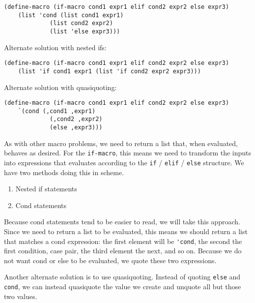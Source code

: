 \begin{blocksection}
\begin{solution}[0.5in]
\begin{lstlisting}
(define-macro (if-macro cond1 expr1 elif cond2 expr2 else expr3)
    (list 'cond (list cond1 expr1)
             (list cond2 expr2)
             (list 'else expr3)))
\end{lstlisting}
Alternate solution with nested ifs:
\begin{lstlisting}
(define-macro (if-macro cond1 expr1 elif cond2 expr2 else expr3)
    (list 'if cond1 expr1 (list 'if cond2 expr2 expr3)))
\end{lstlisting}
Alternate solution with quasiquoting:
\begin{lstlisting}
(define-macro (if-macro cond1 expr1 elif cond2 expr2 else expr3)
    `(cond (,cond1 ,expr1)
             (,cond2 ,expr2)
             (else ,expr3)))
\end{lstlisting}

As with other macro problems, we need to return a list that, 
when evaluated, behaves as desired. For the \lstinline{if-macro}, this
means we need to transform the inputs into expressions that 
evaluates according to the \lstinline{if} / \lstinline{elif} / \lstinline{else} structure. 
We have two methods doing this in scheme. 
\begin{enumerate}
    \item Nested if statements
    \item Cond statements
\end{enumerate}
Because cond statements tend to be easier to read, we will take this 
approach. Since we need to return a list to be evaluated, this means 
we should return a list that matches a cond expression: the first 
element will be \lstinline{'cond}, the second the first condition, case pair, 
the third element the next, and so on. Because we do not want cond 
or else to be evaluated, we quote these two expressions. 

Another alternate solution is to use quasiquoting. 
Instead of quoting \lstinline{else} and \lstinline{cond}, we can instead quasiquote the 
value we create and unquote all but those two values. 

\end{solution}

\end{blocksection}

